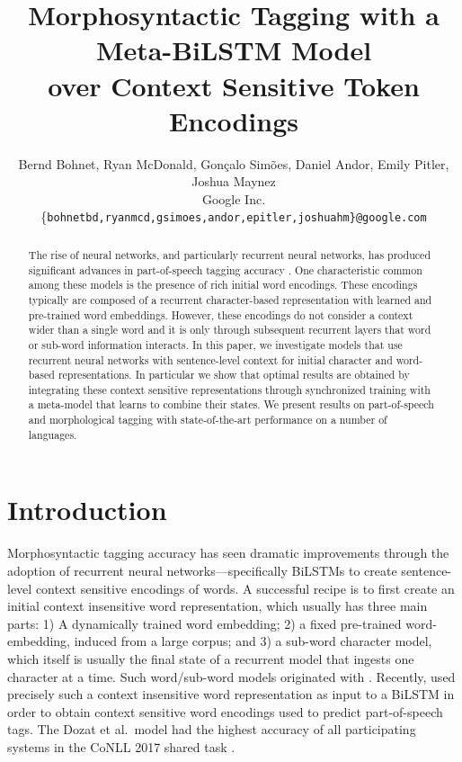 \documentclass[11pt,a4paper]{article}
\title{Morphosyntactic Tagging with a Meta-BiLSTM Model\\ over Context Sensitive Token Encodings\\
}
\author{Bernd Bohnet, Ryan McDonald, Gon\c calo Sim\~oes, Daniel Andor,  Emily Pitler, Joshua Maynez \\
  Google Inc. \\
  {\{\tt bohnetbd,ryanmcd,gsimoes,andor,epitler,joshuahm\}@google.com} }
\date{}
\begin{document}
\maketitle
\begin{abstract}

The rise of neural networks, and particularly recurrent neural networks, has produced significant advances in part-of-speech tagging accuracy \cite{zeman-EtAl:2017:K17-3}.
One characteristic common among these models is the presence of rich initial word encodings.
These encodings typically are composed of a recurrent character-based representation with learned and pre-trained word embeddings.
However, these encodings do not consider a context wider than a single word and it is only through subsequent recurrent layers that word or sub-word information interacts.
In this paper, we investigate models that use recurrent neural networks with sentence-level context for initial character and word-based representations. In particular we show that optimal results are obtained by integrating these context sensitive representations through synchronized training with a meta-model that learns to combine their states.
We present results on part-of-speech and morphological tagging with state-of-the-art performance on a number of languages. 

\end{abstract}

\section{Introduction}

Morphosyntactic tagging accuracy has seen dramatic improvements through the adoption of recurrent neural networks---specifically BiLSTMs \cite{schuster1997bidirectional,graves2005framewise} to create sentence-level context sensitive encodings of words. A successful recipe is to first create an initial context insensitive word representation, which usually has three main parts: 1) A dynamically trained word embedding; 2) a fixed pre-trained word-embedding, induced from a large corpus; and 3) a sub-word character model, which itself is usually the final state of a recurrent model that ingests one character at a time. Such word/sub-word models originated with . Recently,  used precisely such a context insensitive word representation as input to a BiLSTM in order to obtain context sensitive word encodings used to predict part-of-speech tags. The Dozat et al.\ model had the highest accuracy of all participating systems in the CoNLL 2017 shared task \cite{zeman-EtAl:2017:K17-3}.
\end{document}
